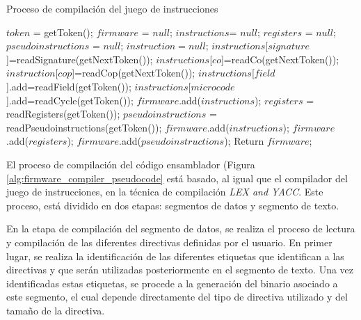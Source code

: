 \clearpage

\begin{algorithm}[h]
	\caption{Proceso de compilación del juego de instrucciones}
	\label{alg:firmware_compiler_pseudocode}
  	\scriptsize
	\begin{algorithmic}[1]
		\State $token$ = getToken();
		\State $firmware$ = $null$;
		\State $instructions $= $null$;
		\State $registers$ = $null$;
		\State $pseudoinstructions$ = $null$;
			\State $instruction = null$;
			\State $instructions$[$signature$]=readSignature(getNextToken());
			\State $instructions$[$co$]=readCo(getNextToken());
				\State $instruction$[$cop$]=readCop(getNextToken());
			\EndIf
				\State $instructions$[$field$].add=readField(getToken());
			\EndWhile
				\State $instructions$[$microcode$].add=readCycle(getToken());
			\EndWhile
			\State $firmware$.add($instructions$);
		\EndWhile
			\State $registers$ = readRegisters(getToken());
		\EndIf
			\State $pseudoinstructions$ = readPseudoinstructions(getToken());
		\EndIf
		\State $firmware$.add($instructions$);
		\State $firmware$.add($registers$);
		\State $firmware$.add($pseudoinstructions$);
		\State Return $firmware$;
		\EndFunction
	\end{algorithmic}
\end{algorithm}

\clearpage

El proceso de compilación del código ensamblador (Figura \ref{alg:firmware_compiler_pseudocode} está basado, al igual que el compilador del juego de instrucciones, en la técnica de compilación \textit{LEX and YACC}. Este proceso, está dividido en dos etapas: segmentos de datos y segmento de texto.

En la etapa de compilación del segmento de datos, se realiza el proceso de lectura y compilación de las diferentes directivas definidas por el usuario. En primer lugar, se realiza la identificación de las diferentes etiquetas que identifican a las directivas y que serán utilizadas posteriormente en el segmento de texto. Una vez identificadas estas etiquetas, se procede a la generación del binario asociado a este segmento, el cual depende directamente del tipo de directiva utilizado y del tamaño de la directiva.

